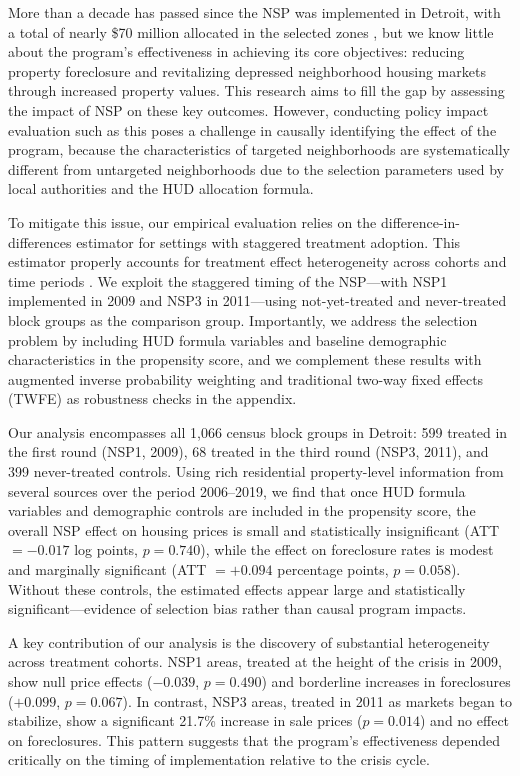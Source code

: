 \documentclass[12pt,authoryear]{elsarticle}
\begin{document}
More than a decade has passed since the NSP was implemented in Detroit, with a total of nearly \$70 million allocated in the selected zones \citep{huddetroit2016}, but we know little about the program's effectiveness in achieving its core objectives: reducing property foreclosure and revitalizing depressed neighborhood housing markets through increased property values. This research aims to fill the gap by assessing the impact of NSP on these key outcomes. However, conducting policy impact evaluation such as this poses a challenge in causally identifying the effect of the program, because the characteristics of targeted neighborhoods are systematically different from untargeted neighborhoods due to the selection parameters used by local authorities and the HUD allocation formula.

To mitigate this issue, our empirical evaluation relies on the \citet{callaway2021} difference-in-differences estimator for settings with staggered treatment adoption. This estimator properly accounts for treatment effect heterogeneity across cohorts and time periods \citep{dechaisemartin2020,goodmanbacon2021,roth2023}. We exploit the staggered timing of the NSP---with NSP1 implemented in 2009 and NSP3 in 2011---using not-yet-treated and never-treated block groups as the comparison group. Importantly, we address the selection problem by including HUD formula variables and baseline demographic characteristics in the propensity score, and we complement these results with augmented inverse probability weighting \citep{wooldridge2023} and traditional two-way fixed effects (TWFE) as robustness checks in the appendix.

Our analysis encompasses all 1,066 census block groups in Detroit: 599 treated in the first round (NSP1, 2009), 68 treated in the third round (NSP3, 2011), and 399 never-treated controls. Using rich residential property-level information from several sources over the period 2006--2019, we find that once HUD formula variables and demographic controls are included in the propensity score, the overall NSP effect on housing prices is small and statistically insignificant (ATT $= -0.017$ log points, $p = 0.740$), while the effect on foreclosure rates is modest and marginally significant (ATT $= +0.094$ percentage points, $p = 0.058$). Without these controls, the estimated effects appear large and statistically significant---evidence of selection bias rather than causal program impacts.

A key contribution of our analysis is the discovery of substantial heterogeneity across treatment cohorts. NSP1 areas, treated at the height of the crisis in 2009, show null price effects ($-0.039$, $p = 0.490$) and borderline increases in foreclosures ($+0.099$, $p = 0.067$). In contrast, NSP3 areas, treated in 2011 as markets began to stabilize, show a significant 21.7\% increase in sale prices ($p = 0.014$) and no effect on foreclosures. This pattern suggests that the program's effectiveness depended critically on the timing of implementation relative to the crisis cycle.
\end{document}
